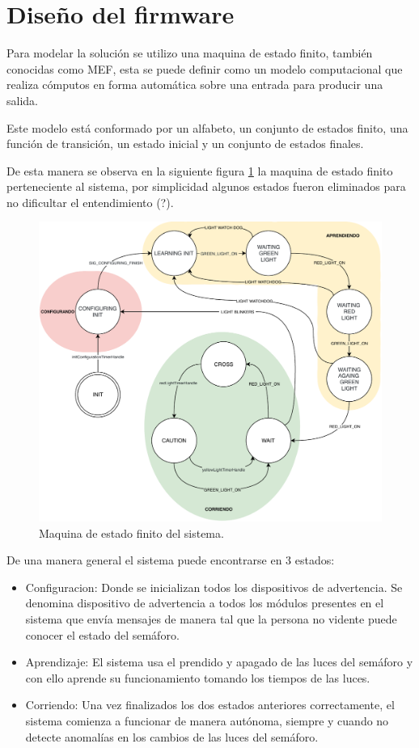 \section{Diseño del firmware}
Para modelar la solución se utilizo una maquina de estado finito, también conocidas como MEF, esta se puede definir como un modelo computacional que realiza cómputos en forma automática sobre una entrada para producir una salida.

Este modelo está conformado por un alfabeto, un conjunto de estados finito, una función de transición, un estado inicial y un conjunto de estados finales.

De esta manera se observa en la siguiente figura \ref{fig:maquinaEstadoFinitoSoniforo}  la maquina de estado finito perteneciente al sistema, por simplicidad algunos estados fueron eliminados para no dificultar el entendimiento (?).

\begin{figure}[h]
	\centering
	\includegraphics[scale=.7]{./Figures/maquinaEstadoFinitoSoniforo.pdf}
	\caption{Maquina de estado finito del sistema.}
	\label{fig:maquinaEstadoFinitoSoniforo}
\end{figure}

De una manera general el sistema puede encontrarse en 3 estados:

\begin{itemize}
\item Configuracion: Donde se inicializan todos los dispositivos de advertencia. Se denomina dispositivo de advertencia a todos los módulos presentes en el sistema que envía mensajes de manera tal que la persona no vidente puede conocer el estado del semáforo.
\item Aprendizaje: El sistema usa el prendido y apagado de las luces del semáforo y con ello aprende su funcionamiento tomando los tiempos de las luces.
\item Corriendo: Una  vez finalizados los dos estados anteriores correctamente, el sistema comienza a funcionar de manera autónoma, siempre y cuando no detecte anomalías en los cambios de las luces del semáforo.
\end{itemize}

